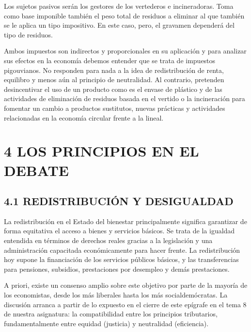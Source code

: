 \documentclass[
]{article}
\begin{document}
Los sujetos pasivos serán los gestores de los vertederos e
incineradoras. Toma como base imponible también el peso total de
residuos a eliminar al que también se le aplica un tipo impositivo. En
este caso, pero, el gravamen dependerá del tipo de residuos.

Ambos impuestos son indirectos y proporcionales en su aplicación y para
analizar sus efectos en la economía debemos entender que se trata de
impuestos pigouvianos. No responden para nada a la idea de
redistribución de renta, equilibro y menos aún al principio de
neutralidad. Al contrario, pretenden desincentivar el uso de un producto
como es el envase de plástico y de las actividades de eliminación de
residuos basada en el vertido o la incineración para fomentar un cambio
a productos sustitutos, nuevas prácticas y actividades relacionadas en
la economía circular frente a la lineal.

\hypertarget{los-principios-en-el-debate}{%
\section*{4 LOS PRINCIPIOS EN EL
DEBATE}\label{los-principios-en-el-debate}}

\hypertarget{redistribuciuxf3n-y-desigualdad}{%
\subsection*{4.1 REDISTRIBUCIÓN Y
DESIGUALDAD}\label{redistribuciuxf3n-y-desigualdad}}

La redistribución en el Estado del bienestar principalmente significa
garantizar de forma equitativa el acceso a bienes y servicios básicos.
Se trata de la igualdad entendida en términos de derechos reales gracias
a la legislación y una administración capacitada económicamente para
hacer frente. La redistribución hoy supone la financiación de los
servicios públicos básicos, y las transferencias para pensiones,
subsidios, prestaciones por desempleo y demás prestaciones.

A priori, existe un consenso amplio sobre este objetivo por parte de la
mayoría de los economistas, desde los más liberales hasta los más
socialdemócratas. La discusión arranca a partir de lo expuesto en el
cierre de este epígrafe en el tema 8 de nuestra asignatura: la
compatibilidad entre los principios tributarios, fundamentalmente entre
equidad (justicia) y neutralidad (eficiencia).
\end{document}

